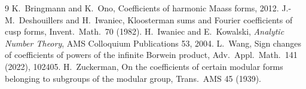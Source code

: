 \documentclass[11pt]{amsart}
\begin{document}
\begin{thebibliography}{9}
 K.~Bringmann and K.~Ono, Coefficients of harmonic Maass forms, 2012.
 J.-M.~Deshouillers and H.~Iwaniec, Kloosterman sums and Fourier coefficients of cusp forms, Invent.\ Math.\ 70 (1982).
 H.~Iwaniec and E.~Kowalski, \emph{Analytic Number Theory}, AMS Colloquium Publications 53, 2004.
 L.~Wang, Sign changes of coefficients of powers of the infinite Borwein product, Adv.\ Appl.\ Math.\ 141 (2022), 102405.
 H.~Zuckerman, On the coefficients of certain modular forms belonging to subgroups of the modular group, Trans.\ AMS 45 (1939).
\end{thebibliography}
\end{document}
